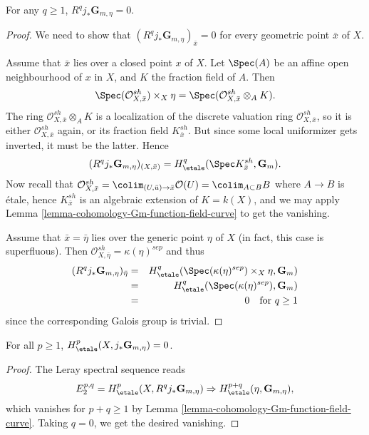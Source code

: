 \begin{lemma}
\label{lemma-higher-direct-jstar-Gm}
For any $q \geq 1$, $R^q j_*\mathbf{G}_{m, \eta} = 0$.
\end{lemma}

\begin{proof}
We need to show that $(R^q j_*\mathbf{G}_{m, \eta})_{\bar x} = 0$ for every
geometric point $\bar x$ of $X$.

\medskip\noindent
Assume that $\bar x$ lies over a closed point $x$ of $X$. Let $\Spec(A)$
be an affine open neighbourhood of $x$ in $X$, and $K$ the fraction field
of $A$. Then
$$
\Spec(\mathcal{O}^{sh}_{X, \bar x}) \times_X \eta =
\Spec(\mathcal{O}^{sh}_{X, \bar x} \otimes_A K).
$$
The ring $\mathcal{O}^{sh}_{X, \bar x} \otimes_A K$ is a localization of
the discrete valuation ring $\mathcal{O}^{sh}_{X, \bar x}$, so it is either
$\mathcal{O}^{sh}_{X, \bar x}$ again, or its fraction field
$K^{sh}_{\bar x}$. But since some local uniformizer gets inverted, it must
be the latter. Hence
$$
(R^q j_*\mathbf{G}_{m, \eta})_{(X, \bar x)} = H_\etale^q(\Spec
K^{sh}_{\bar x}, \mathbf{G}_m).
$$
Now recall that $\mathcal{O}^{sh}_{X, \bar x} =
\colim_{(U, \bar u) \to \bar x} \mathcal{O}(U) = \colim_{A \subset B} B$
where $A \to B$ is \'etale, hence $K^{sh}_{\bar x}$ is an algebraic
extension of $K = k(X)$, and we may apply
Lemma \ref{lemma-cohomology-Gm-function-field-curve}
to get the vanishing.

\medskip\noindent
Assume that $\bar x = \bar \eta$ lies over the generic point $\eta$ of $X$ (in
fact, this case is superfluous). Then
$\mathcal{O}^{sh}_{X, \bar \eta} = \kappa(\eta)^{sep}$ and thus
\begin{eqnarray*}
(R^q j_*\mathbf{G}_{m, \eta})_{\bar \eta}
& = &
H_\etale^q(\Spec(\kappa(\eta)^{sep}) \times_X \eta, \mathbf{G}_m) \\
& = & H_\etale^q (\Spec(\kappa(\eta)^{sep}), \mathbf{G}_m) \\
& = & 0 \ \ \text{ for } q \geq 1
\end{eqnarray*}
since the corresponding Galois group is trivial.
\end{proof}

\begin{lemma}
\label{lemma-cohomology-jstar-Gm}
For all $p \geq 1$, $H_\etale^p(X, j_*\mathbf{G}_{m, \eta}) = 0$.
\end{lemma}

\begin{proof}
The Leray spectral sequence reads
$$
E_2^{p, q} = H_\etale^p(X, R^qj_*\mathbf{G}_{m, \eta}) \Rightarrow
H_\etale^{p+q}(\eta, \mathbf{G}_{m, \eta}),
$$
which vanishes for $p+q \geq 1$ by
Lemma \ref{lemma-cohomology-Gm-function-field-curve}. Taking
$q = 0$, we get the desired vanishing.
\end{proof}

